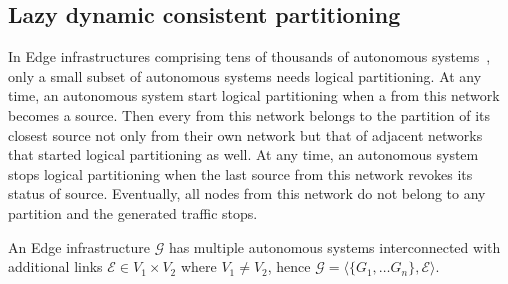 


\subsection{Lazy dynamic consistent partitioning}
\label{subsec:lazy}

In Edge infrastructures comprising tens of thousands of autonomous
systems~\cite{nur2018crossas}, only a small subset of autonomous
systems needs logical partitioning. At any time, an autonomous system
start logical partitioning when a \process from this network becomes a
source.  Then every \process from this network belongs to the
partition of its closest source not only from their own network but
that of adjacent networks that started logical partitioning as well.
At any time, an autonomous system stops logical partitioning when the
last source from this network revokes its status of
source. Eventually, all nodes from this network do not belong to any
partition and the generated traffic stops.

\begin{definition}
  An Edge infrastructure $\mathcal{G}$ has multiple autonomous systems
  interconnected with additional links $\mathcal{E} \in V_1 \times
  V_2$ where $V_1 \neq V_2$, hence $\mathcal{G} = \langle \{G_1,
  \ldots G_n\}, \mathcal{E} \rangle$.
\end{definition}

